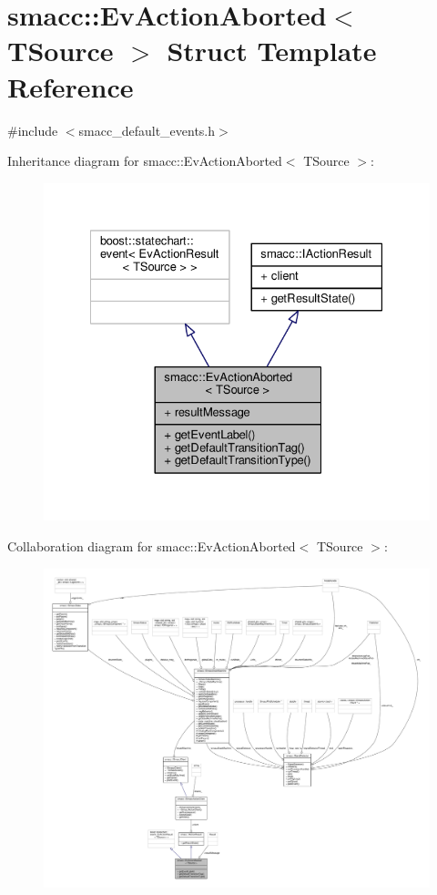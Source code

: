 \hypertarget{structsmacc_1_1EvActionAborted}{}\section{smacc\+:\+:Ev\+Action\+Aborted$<$ T\+Source $>$ Struct Template Reference}
\label{structsmacc_1_1EvActionAborted}


{\ttfamily \#include $<$smacc\+\_\+default\+\_\+events.\+h$>$}



Inheritance diagram for smacc\+:\+:Ev\+Action\+Aborted$<$ T\+Source $>$\+:
\nopagebreak
\begin{figure}[H]
\begin{center}
\leavevmode
\includegraphics[width=328pt]{structsmacc_1_1EvActionAborted__inherit__graph}
\end{center}
\end{figure}


Collaboration diagram for smacc\+:\+:Ev\+Action\+Aborted$<$ T\+Source $>$\+:
\nopagebreak
\begin{figure}[H]
\begin{center}
\leavevmode
\includegraphics[width=350pt]{structsmacc_1_1EvActionAborted__coll__graph}
\end{center}
\end{figure}
